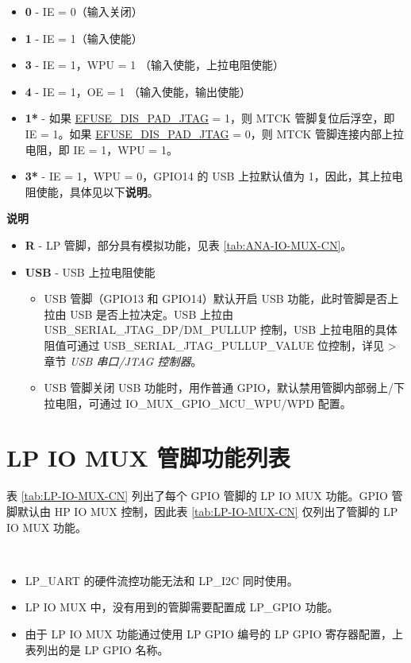 \documentclass[main\_\_CN.tex]{subfiles}
\begin{document}
\begin{itemize}
\item \textbf{0} - IE = 0（输入关闭）
\item \textbf{1} - IE = 1（输入使能）
\item \textbf{3} - IE = 1，WPU = 1 （输入使能，上拉电阻使能）
\item \textbf{4} - IE = 1，OE = 1 （输入使能，输出使能）
\item \textbf{1*} - 如果 \hyperref[fielddesc:EFUSEDISPADJTAG]{EFUSE\_DIS\_PAD\_JTAG} = 1，则 MTCK 管脚复位后浮空，即 IE = 1。如果 \hyperref[fielddesc:EFUSEDISPADJTAG]{EFUSE\_DIS\_PAD\_JTAG} = 0，则 MTCK 管脚连接内部上拉电阻，即 IE = 1，WPU = 1。
\item \textbf{3*} - IE = 1，WPU = 0，GPIO14 的 USB 上拉默认值为 1，因此，其上拉电阻使能，具体见以下\textbf{说明}。
\end{itemize}

\textbf{说明}

\begin{itemize}
\item \textbf{R} - LP 管脚，部分具有模拟功能，见表 \ref{tab:ANA-IO-MUX-CN}。
\item \textbf{USB} - USB 上拉电阻使能
\begin{itemize}
    \item USB 管脚（GPIO13 和 GPIO14）默认开启 USB 功能，此时管脚是否上拉由 USB 是否上拉决定。USB 上拉由 USB\_SERIAL\_JTAG\_DP/DM\_PULLUP 控制，USB 上拉电阻的具体阻值可通过 USB\_SERIAL\_JTAG\_PULLUP\_VALUE 位控制，详见  > 章节 \textit{USB 串口/JTAG 控制器}。
    \item USB 管脚关闭 USB 功能时，用作普通 GPIO，默认禁用管脚内部弱上/下拉电阻，可通过 IO\_MUX\_GPIO\_MCU\_WPU/WPD 配置。
\end{itemize}
\end{itemize}

\section{LP IO MUX 管脚功能列表}
\label{sec:lp_iomux_pads}
表 \ref{tab:LP-IO-MUX-CN} 列出了每个 GPIO 管脚的 LP IO MUX 功能。GPIO 管脚默认由 HP IO MUX 控制，因此表 \ref{tab:LP-IO-MUX-CN} 仅列出了管脚的 LP IO MUX 功能。


\tableheaderLPFunctionsCN
\tablecontentLPFunctions

\begin{importantlisting}\\
    \vspace{-2em}
    \begin{itemize}
        \item LP\_UART 的硬件流控功能无法和 LP\_I2C 同时使用。
        \item LP IO MUX 中，没有用到的管脚需要配置成 LP\_GPIO 功能。
        \item 由于 LP IO MUX 功能通过使用 LP GPIO 编号的 LP GPIO 寄存器配置，上表列出的是 LP GPIO 名称。
    \end{itemize}
\end{importantlisting}
\end{document}

